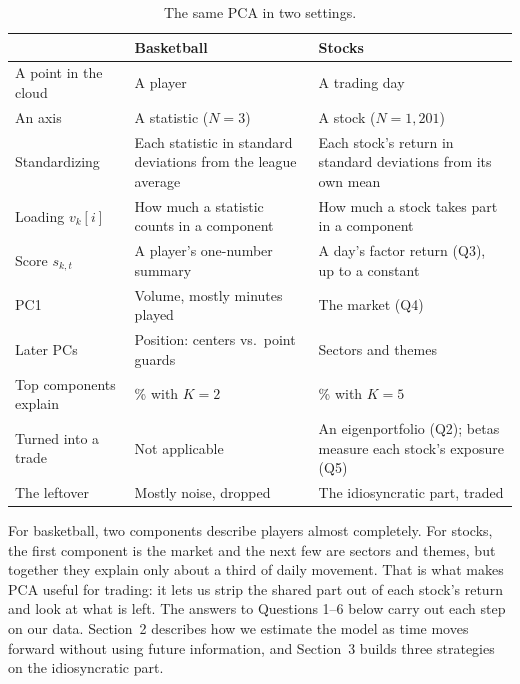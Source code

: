 \documentclass[12pt,letterpaper]{article}
\begin{document}
\begin{table}[H]
\centering
\caption{The same PCA in two settings.}
\label{tab:primer-map}
\small
\begin{tabular}{>{\raggedright\arraybackslash}p{3.4cm} >{\raggedright\arraybackslash}p{5.2cm} >{\raggedright\arraybackslash}p{5.6cm}}
\toprule
& Basketball & Stocks \\
\midrule
A point in the cloud & A player & A trading day \\
An axis & A statistic ($N=3$) & A stock ($N=1{,}201$) \\
Standardizing & Each statistic in standard deviations from the league average & Each stock's return in standard deviations from its own mean \\
Loading $v_k[i]$ & How much a statistic counts in a component & How much a stock takes part in a component \\
Score $s_{k,t}$ & A player's one-number summary & A day's factor return (Q3), up to a constant \\
PC1 & Volume, mostly minutes played & The market (Q4) \\
Later PCs & Position: centers vs.\ point guards & Sectors and themes \\
Top components explain & 93\% with $K=2$ & 35\% with $K=5$ \\
Turned into a trade & Not applicable & An eigenportfolio (Q2); betas measure each stock's exposure (Q5) \\
The leftover & Mostly noise, dropped & The idiosyncratic part, traded \\
\bottomrule
\end{tabular}
\end{table}

For basketball, two components describe players almost completely. For
stocks, the first component is the market and the next few are sectors
and themes, but together they explain only about a third of daily
movement. That is what makes PCA useful for trading: it lets us strip the
shared part out of each stock's return and look at what is left. The
answers to Questions 1--6 below carry out each step on our data.
Section~2 describes how we estimate the model as time moves forward
without using future information, and Section~3 builds three strategies
on the idiosyncratic part.



\newpage
\end{document}

